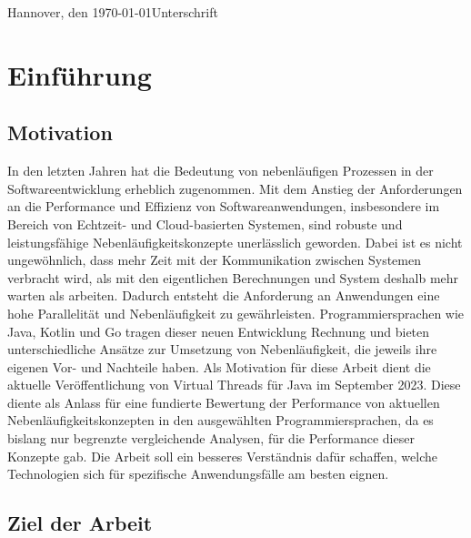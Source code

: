 \documentclass[fontsize=12pt,paper=a4,twoside=semi,parskip=half-,headsepline,headinclude]{scrreprt}
\begin{document}
Hannover, den \today \hfill Unterschrift


\newpage 
\thispagestyle{empty}
\quad 
\newpage


  \tableofcontents  %

\listoffigures      %

\listoftables       %

\chapter{Einführung}

\section{Motivation}

In den letzten Jahren hat die Bedeutung von nebenläufigen Prozessen in der Softwareentwicklung erheblich zugenommen. Mit dem Anstieg der Anforderungen an die Performance und Effizienz von Softwareanwendungen, insbesondere im Bereich von Echtzeit- und Cloud-basierten Systemen, sind robuste und leistungsfähige Nebenläufigkeitskonzepte unerlässlich geworden. Dabei ist es nicht ungewöhnlich, dass mehr Zeit mit der Kommunikation zwischen Systemen verbracht wird, als mit den eigentlichen Berechnungen und System deshalb mehr warten als arbeiten. Dadurch entsteht die Anforderung an Anwendungen eine hohe Parallelität und Nebenläufigkeit zu gewährleisten. Programmiersprachen wie Java, Kotlin und Go tragen dieser neuen Entwicklung Rechnung und bieten unterschiedliche Ansätze zur Umsetzung von Nebenläufigkeit, die jeweils ihre eigenen Vor- und Nachteile haben. Als Motivation für diese Arbeit dient die aktuelle Veröffentlichung von Virtual Threads für Java im September 2023. Diese diente als Anlass für eine fundierte Bewertung der Performance von aktuellen Nebenläufigkeitskonzepten in den ausgewählten Programmiersprachen, da es bislang nur begrenzte vergleichende Analysen, für die Performance dieser Konzepte gab. Die Arbeit soll ein besseres Verständnis dafür schaffen, welche Technologien sich für spezifische Anwendungsfälle am besten eignen.

\section{Ziel der Arbeit}
\end{document}
